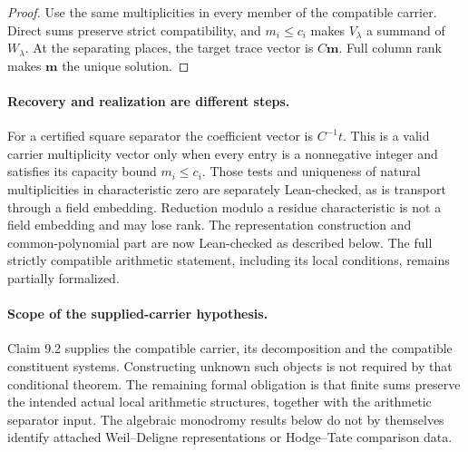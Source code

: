 \documentclass[11pt]{article}
\theoremstyle{definition}
\theoremstyle{remark}
\begin{document}
\begin{proof}
Use the same multiplicities in every member of the compatible carrier.  Direct sums preserve strict compatibility, and \(m_i\le c_i\) makes \(V_\lambda\) a summand of \(W_\lambda\).  At the separating places, the target trace vector is \(C\bm m\).  Full column rank makes \(\bm m\) the unique solution.
\end{proof}

\paragraph{Recovery and realization are different steps.}
For a certified square separator the coefficient vector is $C^{-1}t$.
This is a valid carrier multiplicity vector only when every entry is a
nonnegative integer and satisfies its capacity bound $m_i\le c_i$.
Those tests and uniqueness of natural multiplicities in characteristic zero
are separately Lean-checked, as is transport through a field embedding.
Reduction modulo a residue characteristic is not a field embedding and may
lose rank. The representation construction and common-polynomial part are now
Lean-checked as described below. The full strictly compatible arithmetic
statement, including its local conditions, remains partially formalized.

\paragraph{Scope of the supplied-carrier hypothesis.}
Claim 9.2 supplies the compatible carrier, its decomposition and the compatible
constituent systems. Constructing unknown such objects is not required by that
conditional theorem. The remaining formal obligation is that finite sums preserve
the intended actual local arithmetic structures, together with the arithmetic
separator input. The algebraic monodromy results below do not by themselves
identify attached Weil--Deligne representations or Hodge--Tate comparison data.
\end{document}
